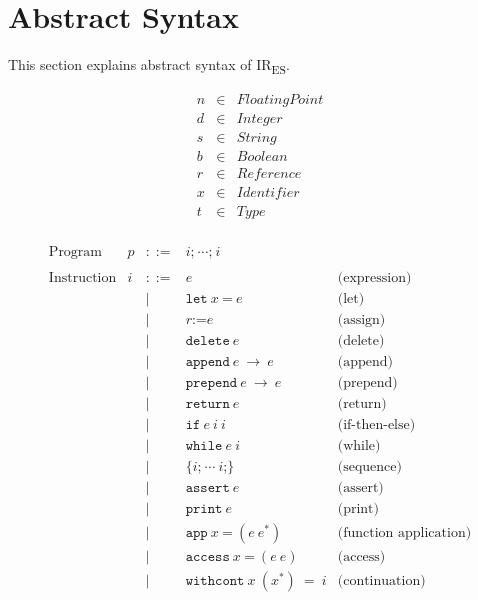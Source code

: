 \documentclass[11pt]{article}
\newcommand{\irnameb}[0]{\textbf{IR\textsubscript{ES}}\xspace}
\newcommand{\irname}[0]{IR\textsubscript{ES}\xspace}
\newcommand{\Term}[1]{\texttt{#1}}
\begin{document}



\section{Abstract Syntax}

This section explains abstract syntax of \irname.

\[
\begin{array}{rrl}
n & \in & \textit{FloatingPoint} \\
d & \in & \textit{Integer} \\
s & \in & \textit{String} \\
b & \in & \textit{Boolean} \\
r & \in & \textit{Reference} \\
x & \in & \textit{Identifier} \\
t & \in & \textit{Type} \\
\end{array}
\]

\[
\begin{array}{rrrll}
\text{Program} & p & ::= & i\Term{;}\ \cdots \Term{;}\ i & \\
\\

\text{Instruction} & i & ::= & e & \text{(expression)} \\
&&|& \Term{let}\ x\ \Term{=}\ e & \text{(let)}\\
&&|& r \Term{:=} e & \text{(assign)}\\
&&|& \Term{delete}\ e & \text{(delete)}\\
&&|& \Term{append}\ e\ \to\ e & \text{(append)}\\
&&|& \Term{prepend}\ e\ \to\ e & \text{(prepend)}\\
&&|& \Term{return}\ e & \text{(return)}\\
&&|& \Term{if}\ e\ i\ i\ & \text{(if-then-else)}\\
&&|& \Term{while}\ e\ i & \text{(while)}\\
&&|& \{ i\Term{;}\ \cdots\ i\Term{;}  \} & \text{(sequence)}\\
&&|& \Term{assert}\ e & \text{(assert)}\\
&&|& \Term{print}\ e & \text{(print)}\\
&&|& \Term{app}\ x\ \Term{=}\ (e\ e^*) & \text{(function application)}\\
&&|& \Term{access}\ x\ \Term{=}\ (e\ e) & \text{(access)}\\
&&|& \Term{withcont}\ x\ (x^*)\ =\ i & \text{(continuation)}\\ 
\\
\end{array}
\]
\end{document}
